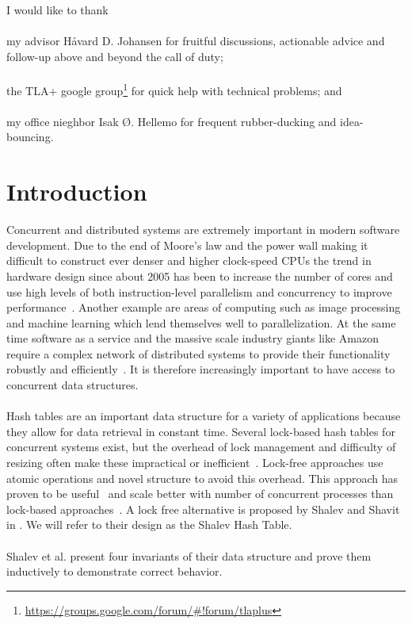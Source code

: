 \documentclass{uit-thesis}
\begin{document}
\begin{acknowledgement}
    I would like to thank\\\\
    my advisor Håvard D. Johansen for fruitful discussions, actionable advice and follow-up above and beyond the call of duty;\\\\
    the TLA+ google group\footnote{\url{https://groups.google.com/forum/\#!forum/tlaplus}} for quick help with technical problems; and\\\\
    my office nieghbor Isak Ø. Hellemo for frequent rubber-ducking and idea-bouncing.
\end{acknowledgement}
\mainmatter

\chapter{Introduction}
Concurrent and distributed systems are extremely important in modern software development. Due to the end of Moore's law and the power wall making it difficult to construct ever denser and higher clock-speed CPUs the trend in hardware design since about 2005 has been to increase the number of cores and use high levels of both instruction-level parallelism and concurrency to improve performance~\cite{Tanenbaum2014}. Another example are areas of computing such as image processing and machine learning which lend themselves well to parallelization. At the same time software as a service and the massive scale industry giants like Amazon require a complex network of distributed systems to provide their functionality robustly and efficiently~\cite{Amazon2015}. It is therefore increasingly important to have access to concurrent data structures.
\\\\
Hash tables are an important data structure for a variety of applications because they allow for data retrieval in constant time. Several lock-based hash tables for concurrent systems exist, but the overhead of lock management and difficulty of resizing often make these impractical or inefficient~\cite{Shalev2006}. Lock-free approaches use atomic operations and novel structure to avoid this overhead. This approach has proven to be useful~\cite{lock-free-structures2013} and scale better with number of concurrent processes than lock-based approaches~\cite{Duarte-Haskell2016}. A lock free alternative is proposed by Shalev and Shavit in \cite{Shalev2006}. We will refer to their design as the Shalev Hash Table.
\\\\
Shalev et al. present four invariants of their data structure and prove them inductively to demonstrate correct behavior.
\end{document}
